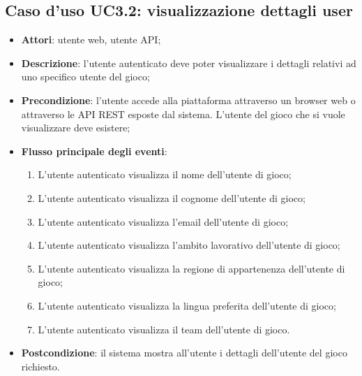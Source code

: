\subsection{Caso d'uso UC3.2: visualizzazione dettagli user}
\begin{itemize}
\item \textbf{Attori}: utente web, utente API;
\item \textbf{Descrizione}: l'utente autenticato deve poter visualizzare i dettagli relativi ad uno specifico utente del gioco; 
      \item \textbf{Precondizione}: l'utente accede alla piattaforma attraverso un browser web o attraverso le API REST esposte dal sistema. L'utente del gioco che si vuole visualizzare deve esistere;

        \item \textbf{Flusso principale degli eventi}:
          \begin{enumerate}
          \item L'utente autenticato visualizza il nome dell'utente di gioco;
          \item L'utente autenticato visualizza il cognome dell'utente di gioco;
          \item L'utente autenticato visualizza l'email dell'utente di gioco;
          \item L'utente autenticato visualizza l'ambito lavorativo dell'utente di gioco;
          \item L'utente autenticato visualizza la regione di appartenenza dell'utente di gioco;
          \item L'utente autenticato visualizza la lingua preferita dell'utente di gioco;
          \item L'utente autenticato visualizza il team dell'utente di gioco.

      \end{enumerate}
    \item \textbf{Postcondizione}: il sistema mostra all'utente i dettagli dell'utente del gioco richiesto.
  \end{itemize}
\hypertarget{UC3.3}{}

